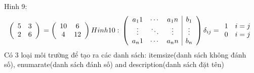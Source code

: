 \documentclass[12pt,a4paper,twoside]{article}
\begin{document}
Hinh 9:\\
\begin{displaymath}
\left(
\begin{array}{cc}
5&3\\
2&6
\end{array}
\right) \\
= \left(
\begin{array}{cc}
10&6\\
4&12\\
\end{array}
\right)\\
\\Hinh 10:\\
\left(
\begin{array}{ccc|c}
a_11&\cdots & a_1n&b_1\\
 \vdots & \ddots & \vdots &\vdots \\
 a_n1 & \cdots & a_nn & b_n\\
\end{array}
\right)
\delta _{ij} = 
\begin{array}{cc}
1 & i = j\\
0 & i = j
\end{array}
\end{displaymath}
Có 3 loại môi trường để tạo ra các danh sách: itemsize(danh sách không đánh số), enumarate(danh sách đánh số) and description(danh sách đặt tên)
\end{document}

